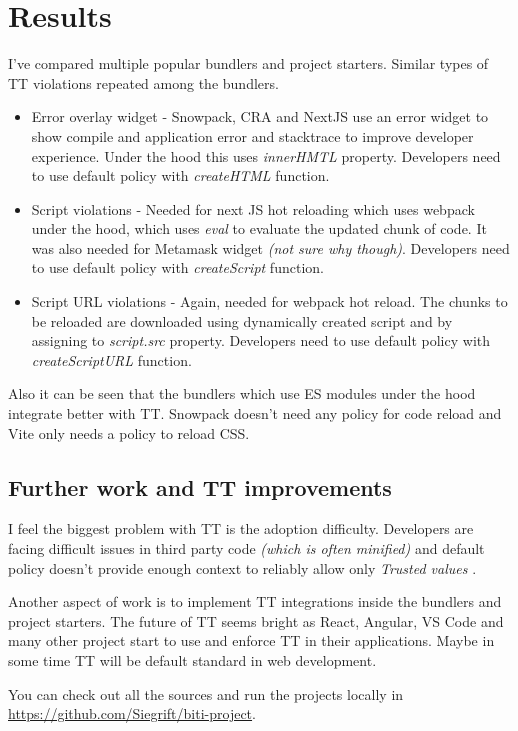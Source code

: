 \chapter{Results}

\label{chapter:results} %

I've compared multiple popular bundlers and project starters. Similar types of TT violations
repeated among the bundlers.

\begin{itemize}
  \item  Error overlay widget - Snowpack, CRA and NextJS use an error widget to show compile and
        application error and stacktrace to improve developer experience. Under the hood this uses
        \emph{innerHMTL} property. Developers need to use default policy with \emph{createHTML}
        function.
  \item  Script violations - Needed for next JS hot reloading which uses webpack under the hood,
        which uses \emph{eval} to evaluate the updated chunk of code. It was also needed for
        Metamask widget \emph{(not sure why though)}. Developers need to use default policy with
        \emph{createScript} function.
  \item  Script URL violations - Again, needed for webpack hot reload. The chunks to be reloaded are
        downloaded using dynamically created script and by assigning to \emph{script.src}
        property. Developers need to use default policy with \emph{createScriptURL} function.
\end{itemize}

Also it can be seen that the bundlers which use ES modules under the hood integrate better with TT.
Snowpack doesn't need any policy for code reload and Vite only needs a policy to reload CSS.

\section{Further work and TT improvements}

I feel the biggest problem with TT is the adoption difficulty. Developers are facing difficult
issues in third party code \emph{(which is often minified)} and default policy doesn't provide
enough context to reliably allow only \emph{Trusted values}
\cite{tt_violation_issue_comment}.

Another aspect of work is to implement TT integrations inside the bundlers and project starters. The
future of TT seems bright as React, Angular, VS Code and many other project start to use and enforce
TT in their applications. Maybe in some time TT will be default standard in web development.

You can check out all the sources and run the projects locally in
\url{https://github.com/Siegrift/biti-project}.
